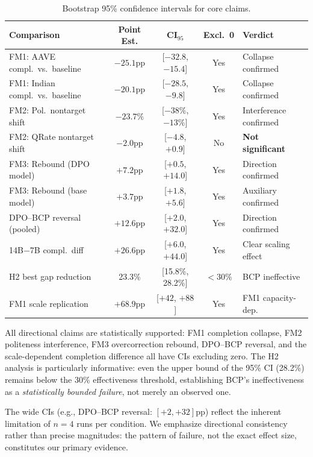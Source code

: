 \documentclass[11pt]{article}
\begin{document}
\begin{table}[t]
\centering
\small
\caption{Bootstrap 95\% confidence intervals for core claims.}
\label{tab:bootstrap}
\begin{tabular}{p{3.6cm}cccl}
\toprule
\textbf{Comparison} & \textbf{Point Est.} & \textbf{CI$_{95}$} & \textbf{Excl.\ 0} & \textbf{Verdict} \\
\midrule
FM1: AAVE compl.\ vs.\ baseline & $-25.1$pp & [$-32.8$, $-15.4$] & Yes & Collapse confirmed \\
FM1: Indian compl.\ vs.\ baseline & $-20.1$pp & [$-28.5$, $-9.8$] & Yes & Collapse confirmed \\
FM2: Pol.\ nontarget shift & $-23.7\%$ & [$-38\%$, $-13\%$] & Yes & Interference confirmed \\
FM2: QRate nontarget shift & $-2.0$pp & [$-4.8$, $+0.9$] & No & \textbf{Not significant} \\
FM3: Rebound (DPO model) & $+7.2$pp & [$+0.5$, $+14.0$] & Yes & Direction confirmed \\
FM3: Rebound (base model) & $+3.7$pp & [$+1.8$, $+5.6$] & Yes & Auxiliary confirmed \\
DPO--BCP reversal (pooled) & $+12.6$pp & [$+2.0$, $+32.0$] & Yes & Direction confirmed \\
14B$-$7B compl.\ diff & $+26.6$pp & [$+6.0$, $+44.0$] & Yes & Clear scaling effect \\
H2 best gap reduction & 23.3\% & [15.8\%, 28.2\%] & $<30\%$ & BCP ineffective \\
FM1 scale replication & $+68.9$pp & [$+42$, $+88$] & Yes & FM1 capacity-dep. \\
\bottomrule
\end{tabular}
\end{table}

All directional claims are statistically supported: FM1 completion collapse, FM2 politeness interference, FM3 overcorrection rebound, DPO--BCP reversal, and the scale-dependent completion difference all have CIs excluding zero. The H2 analysis is particularly informative: even the upper bound of the 95\% CI (28.2\%) remains below the 30\% effectiveness threshold, establishing BCP's ineffectiveness as a \emph{statistically bounded failure}, not merely an observed one.

The wide CIs (e.g., DPO--BCP reversal: $[+2, +32]$pp) reflect the inherent limitation of $n=4$ runs per condition. We emphasize directional consistency rather than precise magnitudes: the pattern of failure, not the exact effect size, constitutes our primary evidence.
\end{document}
